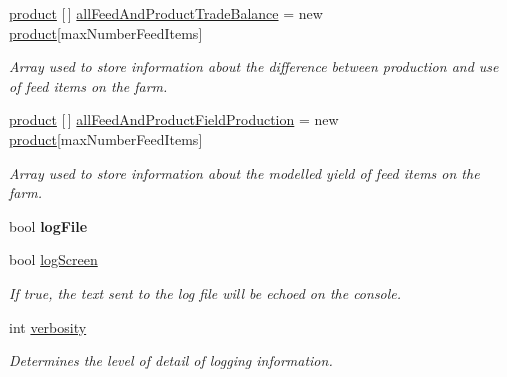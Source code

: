\begin{DoxyCompactItemize}
\mbox{\label{class_global_vars_a19c42ff016a916b57aaece2194efae34}} 
\mbox{\hyperlink{class_global_vars_1_1product}{product}} \mbox{[}$\,$\mbox{]} \mbox{\hyperlink{class_global_vars_a19c42ff016a916b57aaece2194efae34}{all\+Feed\+And\+Product\+Trade\+Balance}} = new \mbox{\hyperlink{class_global_vars_1_1product}{product}}\mbox{[}max\+Number\+Feed\+Items\mbox{]}
\begin{DoxyCompactList}\small\item\em Array used to store information about the difference between production and use of feed items on the farm. \end{DoxyCompactList}\item 
\mbox{\label{class_global_vars_aa1c5d78bdc0b4d2f03b806a5008b94cd}} 
\mbox{\hyperlink{class_global_vars_1_1product}{product}} \mbox{[}$\,$\mbox{]} \mbox{\hyperlink{class_global_vars_aa1c5d78bdc0b4d2f03b806a5008b94cd}{all\+Feed\+And\+Product\+Field\+Production}} = new \mbox{\hyperlink{class_global_vars_1_1product}{product}}\mbox{[}max\+Number\+Feed\+Items\mbox{]}
\begin{DoxyCompactList}\small\item\em Array used to store information about the modelled yield of feed items on the farm. \end{DoxyCompactList}\item 
\mbox{\label{class_global_vars_a73f53602205df5b31fae5ba35cde7f0c}} 
bool {\bfseries log\+File}
\item 
\mbox{\label{class_global_vars_a595268838a351f8166bbf37c837cdec6}} 
bool \mbox{\hyperlink{class_global_vars_a595268838a351f8166bbf37c837cdec6}{log\+Screen}}
\begin{DoxyCompactList}\small\item\em If true, the text sent to the log file will be echoed on the console. \end{DoxyCompactList}\item 
\mbox{\label{class_global_vars_a06d3ac318354fb94dfeeb78256f56217}} 
int \mbox{\hyperlink{class_global_vars_a06d3ac318354fb94dfeeb78256f56217}{verbosity}}
\begin{DoxyCompactList}\small\item\em Determines the level of detail of logging information. \end{DoxyCompactList}\item 

\end{DoxyCompactItemize}
